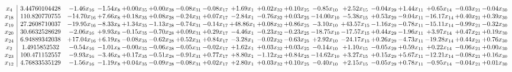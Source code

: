 \documentclass[9pt]{article}
\begin{document}
 \[\begin{array}{c| c c@{\hskip 2pt} c@{\hskip 2pt} c@{\hskip 2pt} c@{\hskip 2pt} c@{\hskip 2pt} c@{\hskip 2pt} c@{\hskip 2pt} c@{\hskip 2pt} c@{\hskip 2pt} c@{\hskip 2pt} c@{\hskip 2pt} c@{\hskip 2pt} c@{\hskip 2pt} c@{\hskip 2pt} c@{\hskip 2pt} c@{\hskip 2pt} }
 x_{4}   &  3.44760104428 & -1.46 x_{16} & -1.54 x_{8} & +  0.00 x_{35} & +  0.00 x_{28} & -0.08 x_{31} & -0.08 x_{17} & +  1.69 x_{1} & +  0.02 x_{32} & +  0.10 x_{25} & -0.85 x_{10} & +  2.52 x_{15} & -0.04 x_{29} & +  1.44 x_{11} & +  0.65 x_{14} & -0.03 x_{21} & -0.04 x_{30}\\
 x_{18}   &  110.820770755 & -14.70 x_{16} & +  7.66 x_{8} & +  0.18 x_{35} & +  0.08 x_{28} & -0.24 x_{31} & +  0.07 x_{17} & -2.84 x_{1} & -0.76 x_{32} & +  0.03 x_{25} & -14.00 x_{10} & -5.38 x_{15} & +  0.53 x_{29} & -9.04 x_{11} & -16.17 x_{14} & +  0.40 x_{21} & +  0.39 x_{30}\\
 x_{19}   &  27.2608710037 & -19.95 x_{16} & -8.33 x_{8} & +  1.34 x_{35} & -1.13 x_{28} & -0.74 x_{31} & -0.14 x_{17} & + 48.86 x_{1} & +  0.08 x_{32} & +  0.86 x_{25} & -3.10 x_{10} & + 43.57 x_{15} & -1.16 x_{29} & -0.78 x_{11} & -15.11 x_{14} & -0.99 x_{21} & -0.32 x_{30}\\
 x_{20}   &  30.6632528629 & -2.06 x_{16} & +  9.93 x_{8} & -0.15 x_{35} & -0.70 x_{28} & +  0.09 x_{31} & +  0.29 x_{17} & -4.46 x_{1} & -0.23 x_{32} & -0.23 x_{25} & -18.75 x_{10} & -17.57 x_{15} & +  0.44 x_{29} & -1.96 x_{11} & +  3.97 x_{14} & +  0.47 x_{21} & +  0.19 x_{30}\\
 x_{24}   &  6.94889342038 & + 17.04 x_{16} & +  6.19 x_{8} & -0.08 x_{35} & -0.62 x_{28} & +  0.52 x_{31} & +  0.84 x_{17} & -3.28 x_{1} & -0.02 x_{32} & -0.63 x_{25} & +  2.92 x_{10} & -24.17 x_{15} & +  0.26 x_{29} & -4.73 x_{11} & -19.28 x_{14} & +  0.44 x_{21} & +  0.76 x_{30}\\
 x_{2}   &  1.4915852532 & -0.54 x_{16} & -1.01 x_{8} & -0.00 x_{35} & -0.06 x_{28} & -0.05 x_{31} & -0.02 x_{17} & +  1.62 x_{1} & +  0.03 x_{32} & +  0.03 x_{25} & -0.14 x_{10} & +  1.10 x_{15} & -0.05 x_{29} & +  0.59 x_{11} & +  0.22 x_{14} & -0.06 x_{21} & +  0.00 x_{30}\\
 x_{23}   &  100.471152557 & -9.93 x_{16} & -3.46 x_{8} & +  0.17 x_{35} & -0.51 x_{28} & -0.91 x_{31} & +  0.77 x_{17} & +  8.80 x_{1} & -1.12 x_{32} & +  0.84 x_{25} & -14.62 x_{10} & +  3.27 x_{15} & +  0.15 x_{29} & +  5.67 x_{11} & -12.21 x_{14} & -0.08 x_{21} & +  0.16 x_{30}\\
 x_{12}   &  4.76833535129 & -1.56 x_{16} & -1.19 x_{8} & +  0.04 x_{35} & -0.09 x_{28} & -0.08 x_{31} & +  0.02 x_{17} & +  2.80 x_{1} & +  0.03 x_{32} & +  0.10 x_{25} & -0.40 x_{10} & +  2.15 x_{15} & -0.05 x_{29} & +  0.78 x_{11} & -0.95 x_{14} & -0.04 x_{21} & +  0.01 x_{30}\\

\end{array}\]
\end{document}
